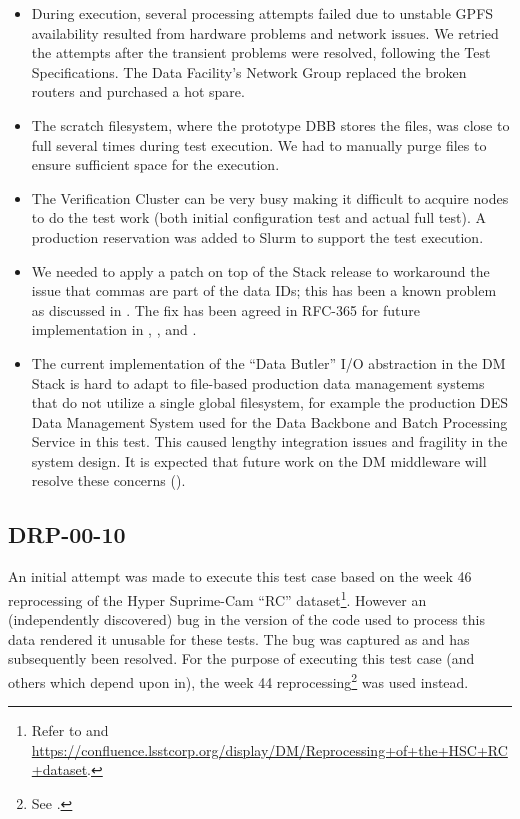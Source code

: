 \documentclass[DM,STR,toc]{lsstdoc}
\begin{document}
\begin{itemize}

  \item{
    During execution, several processing attempts failed due to unstable GPFS availability resulted from hardware problems and network issues.
    We retried the attempts after the transient problems were resolved, following the Test Specifications.
    The Data Facility's Network Group replaced the broken routers and purchased a hot spare.
  }

  \item{
    The scratch filesystem, where the prototype DBB stores the files, was close to full several times during test execution.
	We had to manually purge files to ensure sufficient space for the execution.
  }

  \item{
    The Verification Cluster can be very busy making it difficult to acquire nodes to do the test work (both initial configuration test and actual full test).
        A production reservation was added to Slurm to support the test execution.
  }

  \item{
    We needed to apply a patch on top of the Stack release to workaround the issue that commas are part of the data IDs; this has been a known problem as discussed in .
	The fix has been agreed in RFC-365 for future implementation in , , and .
  }

  \item{
    The current implementation of the “Data Butler” I/O abstraction in the DM Stack is hard to adapt to file-based production data management systems that do not utilize a single global filesystem, for example the production DES Data Management System used for the Data Backbone and Batch Processing Service in this test.
    This caused lengthy integration issues and fragility in the system design.
    It is expected that future work on the DM middleware will resolve these concerns ().
  }
\end{itemize}

\subsection{DRP-00-10}
\label{sect:problems-drp-00-10}

An initial attempt was made to execute this test case based on the week 46 reprocessing of the Hyper Suprime-Cam ``RC'' dataset\footnote{Refer to  and \url{https://confluence.lsstcorp.org/display/DM/Reprocessing+of+the+HSC+RC+dataset}.}.
However an (independently discovered) bug in the version of the code used to process this data rendered it unusable for these tests.
The bug was captured as  and has subsequently been resolved.
For the purpose of executing this test case (and others which depend upon in), the week 44 reprocessing\footnote{See .} was used instead.
\end{document}
